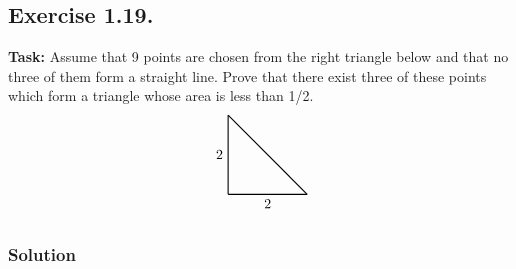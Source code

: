 \documentclass{article}
\begin{document}
\subsection{Exercise 1.19.} 
\textbf{Task:} Assume that 9 points are chosen from the right triangle below and that no three of them form a straight line. Prove that there exist three of these points which form a triangle whose area is less than 1/2. 
\[
\begin{tikzpicture}
    \draw[thick] (0,0) -- (0,2) node[midway, left] {2}; %
    \draw[thick] (0,0) -- (2,0) node[midway, below] {2}; %
    \draw[thick] (0,2) -- (2,0) node[midway, above, sloped] {}; %
\end{tikzpicture}
\]

\subsubsection*{Solution}
\end{document}
